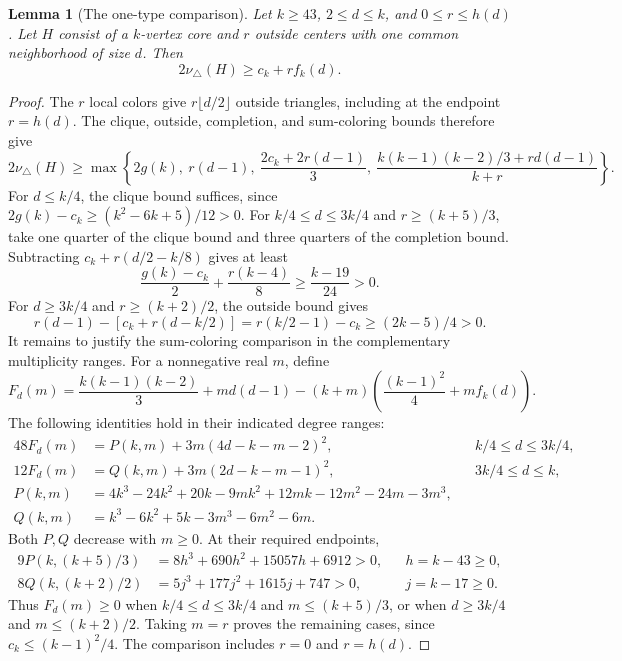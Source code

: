 \documentclass[11pt]{article}
\newtheorem{lemma}[theorem]{Lemma}
\newcommand{\tp}{\nu_{\triangle}}
\begin{document}
\begin{lemma}[The one-type comparison]
\label{lem:single-type-certificate}
Let $k\geq43$, $2\leq d\leq k$, and $0\leq r\leq h(d)$.
Let $H$ consist of a $k$-vertex core and $r$ outside centers with one
common neighborhood of size $d$. Then
\[
 2\tp(H)\geq c_k+r f_k(d).
\]
\end{lemma}
\begin{proof}
The $r$ local colors give $r\lfloor d/2\rfloor$ outside triangles,
including at the endpoint $r=h(d)$. The clique, outside, completion,
and sum-coloring bounds therefore give
\[
 2\tp(H)\geq\max\left\{2g(k),\ r(d-1),\
 \frac{2c_k+2r(d-1)}3,\
 \frac{k(k-1)(k-2)/3+r d(d-1)}{k+r}\right\}.
\]
For $d\leq k/4$, the clique bound suffices, since
$2g(k)-c_k\geq(k^2-6k+5)/12>0$.
For $k/4\leq d\leq3k/4$ and $r\geq(k+5)/3$, take one quarter of
the clique bound and three quarters of the completion bound. Subtracting
$c_k+r(d/2-k/8)$ gives at least
\[
 \frac{g(k)-c_k}{2}+\frac{r(k-4)}8
 \geq\frac{k-19}{24}>0.
\]
For $d\geq3k/4$ and $r\geq(k+2)/2$, the outside bound gives
\[
 r(d-1)-[c_k+r(d-k/2)]
 =r(k/2-1)-c_k\geq(2k-5)/4>0.
\]
It remains to justify the sum-coloring comparison in the complementary
multiplicity ranges. For a nonnegative real $m$, define
\[
 F_d(m)=\frac{k(k-1)(k-2)}3+md(d-1)
 -(k+m)\left(\frac{(k-1)^2}{4}+m f_k(d)\right).
\]
The following identities hold in their indicated degree ranges:
\begin{align*}
 48F_d(m)&=P(k,m)+3m(4d-k-m-2)^2,
       &&k/4\leq d\leq3k/4,\\
 12F_d(m)&=Q(k,m)+3m(2d-k-m-1)^2,
       &&3k/4\leq d\leq k,\\
 P(k,m)&=4k^3-24k^2+20k-9mk^2+12mk-12m^2-24m-3m^3,\\
 Q(k,m)&=k^3-6k^2+5k-3m^3-6m^2-6m.
\end{align*}
Both $P,Q$ decrease with $m\geq0$. At their required endpoints,
\begin{align*}
 9P(k,(k+5)/3)&=8h^3+690h^2+15057h+6912>0,
       &&h=k-43\geq0,\\
 8Q(k,(k+2)/2)&=5j^3+177j^2+1615j+747>0,
       &&j=k-17\geq0.
\end{align*}
Thus $F_d(m)\geq0$ when $k/4\leq d\leq3k/4$ and
$m\leq(k+5)/3$, or when $d\geq3k/4$ and $m\leq(k+2)/2$.
Taking $m=r$ proves the remaining cases, since
$c_k\leq(k-1)^2/4$. The comparison includes $r=0$ and $r=h(d)$.
\end{proof}
\end{document}
